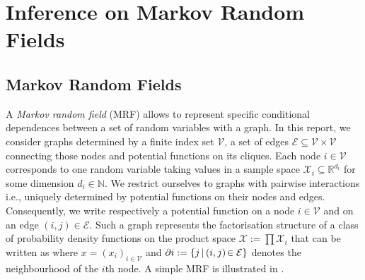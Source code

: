 

\section{Inference on Markov Random Fields}


\subsection{\label{subsection: mrf}Markov Random Fields}


%
A \emph{Markov random field} (MRF) allows to represent specific conditional dependences between a set of random variables with a graph. 
In this report, we consider graphs determined by a finite index set $\mathcal V$, a set of edges $\mathcal E\subseteq \mathcal V\times \mathcal V$ connecting those nodes and potential functions on its cliques. Each node $i\in\mathcal V$ corresponds to one random variable taking values in a sample space $\mathcal X_i \subseteq\mathbb R^{d_i}$ for some dimension $d_i\in\mathbb N$. We restrict ourselves to graphs with pairwise interactions i.e., uniquely determined by potential functions on their nodes and edges. 
Consequently, we write
%
% 
respectively a potential function on a node $i\in \mathcal V$ and on an edge $(i,j)\in \mathcal E$. 
Such a graph represents the factorisation structure of a class of probability density functions on the product space $\mathcal X := \prod\mathcal X_{i}$ that can be written as
where $x=(x_{i})_{i\in \mathcal V}$ and $\partial i:=\{j\,|\, (i,j)\!\in\,\!\mathcal E\}$ denotes the neighbourhood of the $i$th node. 
A simple MRF is illustrated in .\\

